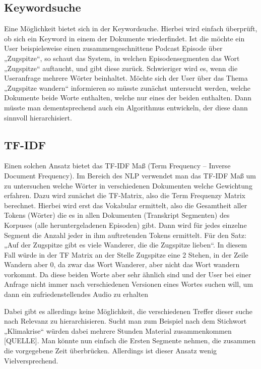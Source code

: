 \subsection{Keywordsuche}


Eine Möglichkeit bietet sich in der Keywordsuche. 
Hierbei wird einfach überprüft, ob sich ein Keyword in einem der Dokumente wiederfindet. Ist die möchte ein User beispielsweise einen zusammengeschnittene Podcast Episode über „Zugspitze“, so schaut das System, in welchen Episodensegmenten das Wort „Zugspitze“ auftaucht, und gibt diese zurück. 
Schwieriger wird es, wenn die Useranfrage mehrere Wörter beinhaltet. 
Möchte sich der User über das Thema „Zugspitze wandern“ informieren so müsste zunächst untersucht werden, welche Dokumente beide Worte enthalten, welche nur eines der beiden enthalten. 
Dann müsste man dementsprechend auch ein Algorithmus entwickeln, der diese dann sinnvoll hierarchisiert. 

\subsection{TF-IDF}

Einen solchen Ansatz bietet das TF-IDF Maß (Term Frequency – Inverse Document Frequency). 
Im Bereich des NLP verwendet man das TF-IDF Maß um zu untersuchen welche Wörter in verschiedenen Dokumenten welche Gewichtung erfahren. 
Dazu wird zunächst die TF-Matrix, also die Term Frequenzy Matrix berechnet. 
Hierbei wird erst das Vokabular ermittelt, also die Gesamtheit aller Tokens (Wörter) die es in allen Dokumenten (Transkript Segmenten) des Korpuses (alle heruntergeladenen Episoden) gibt. 
Dann wird für jedes einzelne Segment die Anzahl jeder in ihm auftretenden Tokens ermittelt. 
Für den Satz: „Auf der Zugspitze gibt es viele Wanderer, die die Zugspitze lieben“. 
In diesem Fall würde in der TF Matrix an der Stelle Zugspitze eine 2 Stehen, in der Zeile Wandern aber 0, da zwar das Wort Wanderer, aber nicht das Wort wandern vorkommt. 
Da diese beiden Worte aber sehr ähnlich sind und der User bei einer Anfrage nicht immer nach verschiedenen Versionen eines Wortes suchen will, um dann ein zufriedenstellendes Audio zu erhalten


Dabei gibt es allerdings keine Möglichkeit, die verschiedenen Treffer dieser suche nach Relevanz zu hierarchisieren. Sucht man zum Beispiel nach dem Stichwort „Klimakrise“ würden dabei mehrere Stunden Material zusammenkommen [QUELLE]. 
Man könnte nun einfach die Ersten Segmente nehmen, die zusammen die vorgegebene Zeit überbrücken. Allerdings ist dieser Ansatz wenig Vielversprechend. 


